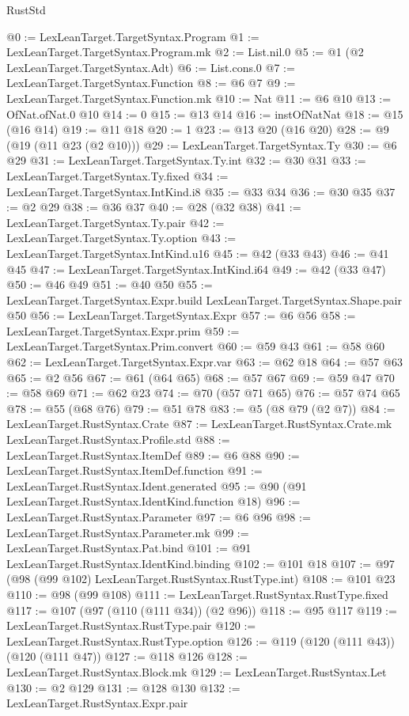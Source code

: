 \begin{lexlean}{RustStd}
\begin{coremodule}
{\begin{coremodule}
{{{{{@0 := LexLeanTarget.TargetSyntax.Program
@1 := LexLeanTarget.TargetSyntax.Program.mk
@2 := List.nil.{0}
@5 := @1 (@2 LexLeanTarget.TargetSyntax.Adt)
@6 := List.cons.{0}
@7 := LexLeanTarget.TargetSyntax.Function
@8 := @6 @7
@9 := LexLeanTarget.TargetSyntax.Function.mk
@10 := Nat
@11 := @6 @10
@13 := OfNat.ofNat.{0} @10
@14 := 0
@15 := @13 @14
@16 := instOfNatNat
@18 := @15 (@16 @14)
@19 := @11 @18
@20 := 1
@23 := @13 @20 (@16 @20)
@28 := @9 (@19 (@11 @23 (@2 @10)))
@29 := LexLeanTarget.TargetSyntax.Ty
@30 := @6 @29
@31 := LexLeanTarget.TargetSyntax.Ty.int
@32 := @30 @31
@33 := LexLeanTarget.TargetSyntax.Ty.fixed
@34 := LexLeanTarget.TargetSyntax.IntKind.i8
@35 := @33 @34
@36 := @30 @35
@37 := @2 @29
@38 := @36 @37
@40 := @28 (@32 @38)
@41 := LexLeanTarget.TargetSyntax.Ty.pair
@42 := LexLeanTarget.TargetSyntax.Ty.option
@43 := LexLeanTarget.TargetSyntax.IntKind.u16
@45 := @42 (@33 @43)
@46 := @41 @45
@47 := LexLeanTarget.TargetSyntax.IntKind.i64
@49 := @42 (@33 @47)
@50 := @46 @49
@51 := @40 @50
@55 := LexLeanTarget.TargetSyntax.Expr.build LexLeanTarget.TargetSyntax.Shape.pair @50
@56 := LexLeanTarget.TargetSyntax.Expr
@57 := @6 @56
@58 := LexLeanTarget.TargetSyntax.Expr.prim
@59 := LexLeanTarget.TargetSyntax.Prim.convert
@60 := @59 @43
@61 := @58 @60
@62 := LexLeanTarget.TargetSyntax.Expr.var
@63 := @62 @18
@64 := @57 @63
@65 := @2 @56
@67 := @61 (@64 @65)
@68 := @57 @67
@69 := @59 @47
@70 := @58 @69
@71 := @62 @23
@74 := @70 (@57 @71 @65)
@76 := @57 @74 @65
@78 := @55 (@68 @76)
@79 := @51 @78
@83 := @5 (@8 @79 (@2 @7))
@84 := LexLeanTarget.RustSyntax.Crate
@87 := LexLeanTarget.RustSyntax.Crate.mk LexLeanTarget.RustSyntax.Profile.std
@88 := LexLeanTarget.RustSyntax.ItemDef
@89 := @6 @88
@90 := LexLeanTarget.RustSyntax.ItemDef.function
@91 := LexLeanTarget.RustSyntax.Ident.generated
@95 := @90 (@91 LexLeanTarget.RustSyntax.IdentKind.function @18)
@96 := LexLeanTarget.RustSyntax.Parameter
@97 := @6 @96
@98 := LexLeanTarget.RustSyntax.Parameter.mk
@99 := LexLeanTarget.RustSyntax.Pat.bind
@101 := @91 LexLeanTarget.RustSyntax.IdentKind.binding
@102 := @101 @18
@107 := @97 (@98 (@99 @102) LexLeanTarget.RustSyntax.RustType.int)
@108 := @101 @23
@110 := @98 (@99 @108)
@111 := LexLeanTarget.RustSyntax.RustType.fixed
@117 := @107 (@97 (@110 (@111 @34)) (@2 @96))
@118 := @95 @117
@119 := LexLeanTarget.RustSyntax.RustType.pair
@120 := LexLeanTarget.RustSyntax.RustType.option
@126 := @119 (@120 (@111 @43)) (@120 (@111 @47))
@127 := @118 @126
@128 := LexLeanTarget.RustSyntax.Block.mk
@129 := LexLeanTarget.RustSyntax.Let
@130 := @2 @129
@131 := @128 @130
@132 := LexLeanTarget.RustSyntax.Expr.pair
}}}}}
\end{coremodule}}
\end{coremodule}
\end{lexlean}
